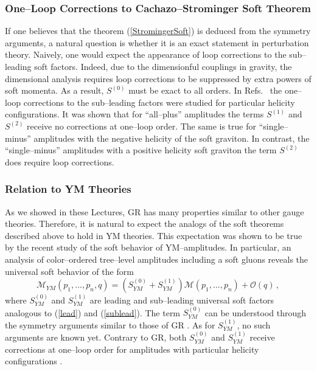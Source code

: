 \documentclass[11pt,a4paper]{article}
\newcommand{\be}{\begin{equation}}
\newcommand{\ee}{\end{equation}}
\newcommand{\M}{\mathcal{M}}
\begin{document}
\subsubsection{One--Loop Corrections to Cachazo--Strominger Soft Theorem}

If one believes that the theorem (\ref{StromingerSoft}) is deduced from the symmetry arguments, a natural question is whether it is an exact statement in perturbation theory.
Naively, one would expect the appearance of loop corrections to the sub--leading soft factors.
Indeed, due to the dimensionful couplings in gravity, the dimensional analysis requires loop corrections to be suppressed by extra powers of soft momenta. As a result, $S^{(0)}$ must be exact to all orders. In Refs.~\cite{Bern:2014oka,He:2014bga} the one--loop corrections to the sub--leading factors were studied for particular helicity configurations. It was shown that for ``all--plus'' amplitudes the terms $S^{(1)}$ and $S^{(2)}$ receive no corrections at one--loop order.
The same is true for ``single--minus'' amplitudes with the negative helicity of the soft graviton.
In contrast, the ``single--minus'' amplitudes with a positive helicity soft graviton the term $S^{(2)}$ does
require loop corrections.

\subsubsection{Relation to YM Theories}

As we showed  in these Lectures, GR has many properties similar to other gauge theories.
Therefore, it is natural to expect the analogs of the soft theorems described above to hold in YM theories.
This expectation was shown to be true by the recent study of the soft behavior of YM--amplitudes.
In particular, an analysis of color--ordered tree--level amplitudes including a soft gluons
reveals the universal soft behavior of the form \cite{Casali:2014xpa}
\be
\M_{YM}(p_1,...,p_n,q)=(S^{(0)}_{YM}+S^{(1)}_{YM})\M(p_1,...,p_n)+\mathcal{O}(q)\,,
\ee
where $S^{(0)}_{YM}$ and $S^{(1)}_{YM}$ are leading and sub--leading universal soft factors analogous to (\ref{lead}) and (\ref{sublead}). The term $S^{(0)}_{YM}$ can be understood through the symmetry arguments similar to those of GR \cite{Strominger:2013lka}. As for $S^{(1)}_{YM}$, no such arguments are known yet. Contrary to GR, both $S^{(0)}_{YM}$ and $S^{(1)}_{YM}$ receive corrections at one--loop order for
amplitudes with particular helicity configurations \cite{He:2014bga}.
\end{document}
